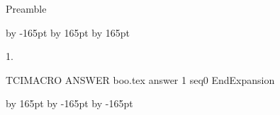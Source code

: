 Preamble


\renewcommand{\RM}{1}%
\setcounter{page}{2}%
\setlength{\columnsep}{24pt}
\advance \leftskip by -165pt
\advance\hsize by 165pt
\advance\linewidth by 165pt
\begin{multicols}{2}%


\begin{ExerciseList}

\item[\hfill 1.]

TCIMACRO
ANSWER
boo.tex answer 1 seq0
EndExpansion

\end{ExerciseList}


\end{multicols}
\advance \leftskip by 165pt
\advance\hsize by -165pt
\advance\linewidth by -165pt%




